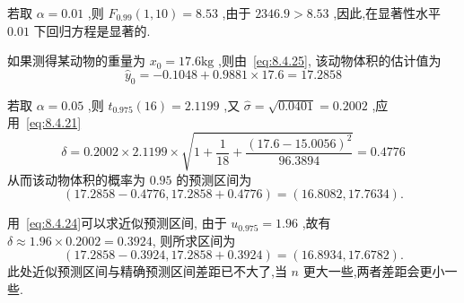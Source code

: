 \begin{example}
  \noindent 若取 $\alpha=0.01$ ,则 $F_{0.99}(1,10)=8.53$ ,由于 $2346.9>8.53$ ,因此,在显著性水平 $0.01$ 下回归方程是显著的.

    如果测得某动物的重量为 $x_0=17.6\si{\kilogram}$ ,则由~\eqref{eq:8.4.25}, 该动物体积的估计值为
    \begin{equation*}
    \hat{y}_{0}=-0.1048+0.9881 \times 17.6=17.2858
    \end{equation*}

    若取 $\alpha=0.05$ ,则 $t_{0.975}(16)=2.1199$ ,又 $\hat{\sigma}=\sqrt{0.0401}=0.2002$ ,应用~\eqref{eq:8.4.21}
    \begin{equation*}
    \delta=0.2002 \times 2.1199 \times \sqrt{1+\frac{1}{18}+\frac{(17.6-15.0056)^{2}}{96.3894}}=0.4776
    \end{equation*}
    从而该动物体积的概率为 $0.95$ 的预测区间为
    \begin{equation*}
      (17.2858 - 0.4776, 17.2858 + 0.4776)=(16.8082, 17.7634).
    \end{equation*}

    用~\eqref{eq:8.4.24}可以求近似预测区间, 由于 $u_{0.975}=1.96$ ,故有 $\delta \approx 1.96\times 0.2002=0.3924$, 则所求区间为
    \begin{equation*}
    (17.2858 - 0.392 4, 17.2858 + 0.3924)=(16.8934,17.6782).
    \end{equation*}
    此处近似预测区间与精确预测区间差距已不大了,当 $n$ 更大一些,两者差距会更小一些.
\end{example}

